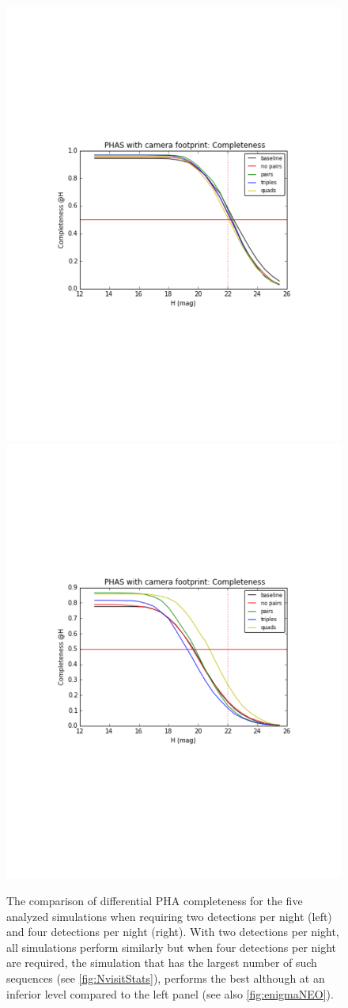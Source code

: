 \begin{figure}[th!]
\vskip -1.2in
\includegraphics[angle=0,width=0.49\hsize:,clip]{figs/diffNEOpairs.pdf}
\includegraphics[angle=0,width=0.49\hsize:,clip]{figs/diffNEOquads.pdf}
\vskip -1.3in
\caption{
The comparison of differential PHA completeness for the five analyzed simulations
when requiring two detections per night (left) and four detections per night (right).
With two detections per night, all simulations perform similarly but when four
detections per night are required, the simulation that has the largest number
of such sequences (see \autoref{fig:NvisitStats}), performs the best although at an
inferior level compared to the left panel (see also \autoref{fig:enigmaNEO}).}
\label{fig:NEOquads}
\end{figure}


